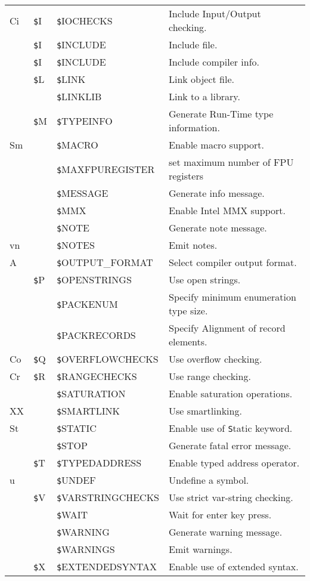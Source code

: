 \documentclass{article}
\newcommand{\var}[1]{{\texttt #1}}
\begin{document}
\begin{tabularx}{\textwidth}{lllX}
Ci &\var{\$I} & \var{\$IOCHECKS} & Include Input/Output checking. \\
&\var{\$I} & \var{\$INCLUDE} & Include file.  \\
&\var{\$I} & \var{\$INCLUDE} & Include compiler info. \\
&\var{\$L} & \var{\$LINK} & Link object file. \\
&& \var{\$LINKLIB} & Link to a library. \\
&\var{\$M} & \var{\$TYPEINFO} & Generate Run-Time type information. \\
Sm & & \var{\$MACRO} & Enable macro support. \\
& & \var{\$MAXFPUREGISTER} & set maximum number of FPU registers \\
&& \var{\$MESSAGE} & Generate info message. \\
&& \var{\$MMX} & Enable Intel MMX support. \\
&& \var{\$NOTE} & Generate note message. \\
vn && \var{\$NOTES} & Emit notes. \\
A && \var{\$OUTPUT\_FORMAT} & Select compiler output format. \\
&\var{\$P} & \var{\$OPENSTRINGS} & Use open strings. \\
&& \var{\$PACKENUM} & Specify minimum enumeration type size. \\
&& \var{\$PACKRECORDS} & Specify Alignment of record elements. \\
Co &\var{\$Q} & \var{\$OVERFLOWCHECKS}& Use overflow checking. \\
Cr &\var{\$R} & \var{\$RANGECHECKS} & Use range checking. \\
&& \var{\$SATURATION} & Enable saturation operations. \\
XX && \var{\$SMARTLINK} & Use smartlinking. \\
St && \var{\$STATIC} & Enable use of \var{Static} keyword. \\
&& \var{\$STOP} & Generate fatal error message. \\
&\var{\$T} & \var{\$TYPEDADDRESS} & Enable typed address operator. \\
u && \var{\$UNDEF} & Undefine a symbol. \\
&\var{\$V} & \var{\$VARSTRINGCHECKS} & Use strict var-string checking. \\
&& \var{\$WAIT} & Wait for enter key press. \\
&& \var{\$WARNING} & Generate warning message. \\
&& \var{\$WARNINGS} & Emit warnings. \\
&\var{\$X} & \var{\$EXTENDEDSYNTAX} & Enable use of extended syntax. \\ \hline
\end{tabularx}
\end{document}
